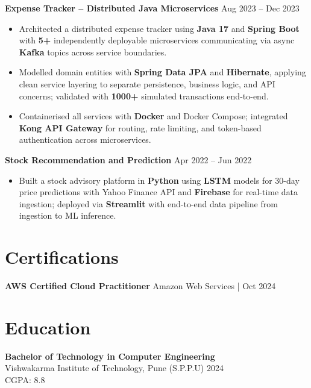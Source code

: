 \documentclass[a4paper,10pt]{article}
\begin{document}
\textbf{Expense Tracker -- Distributed Java Microservices} \hfill Aug 2023 -- Dec 2023
\begin{itemize}[leftmargin=*]
    \item Architected a distributed expense tracker using \textbf{Java 17} and \textbf{Spring Boot} with \textbf{5+} independently deployable microservices communicating via async \textbf{Kafka} topics across service boundaries.
    \item Modelled domain entities with \textbf{Spring Data JPA} and \textbf{Hibernate}, applying clean service layering to separate persistence, business logic, and API concerns; validated with \textbf{1000+} simulated transactions end-to-end.
    \item Containerised all services with \textbf{Docker} and Docker Compose; integrated \textbf{Kong API Gateway} for routing, rate limiting, and token-based authentication across microservices.
\end{itemize}

\textbf{Stock Recommendation and Prediction} \hfill Apr 2022 -- Jun 2022
\begin{itemize}[leftmargin=*]
    \item Built a stock advisory platform in \textbf{Python} using \textbf{LSTM} models for 30-day price predictions with Yahoo Finance API and \textbf{Firebase} for real-time data ingestion; deployed via \textbf{Streamlit} with end-to-end data pipeline from ingestion to ML inference.
\end{itemize}

\section*{Certifications}
\textbf{AWS Certified Cloud Practitioner} \hfill Amazon Web Services \;|\; Oct 2024

\section*{Education}

\textbf{Bachelor of Technology in Computer Engineering} \\
Vishwakarma Institute of Technology, Pune (S.P.P.U) \hfill 2024 \\
CGPA: 8.8
\end{document}
